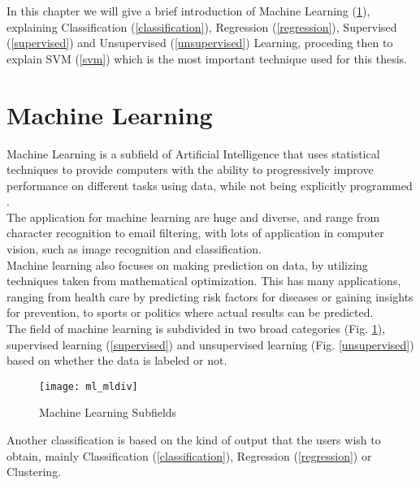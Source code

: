 In this chapter we will give a brief introduction of Machine Learning (\ref{ml}), explaining Classification (\ref{classification}), Regression (\ref{regression}), Supervised (\ref{supervised}) and Unsupervised (\ref{unsupervised}) Learning, proceding then to explain SVM (\ref{svm}) which is the most important technique used for this thesis.

\section{Machine Learning} \label{ml}
Machine Learning is a subfield of Artificial Intelligence that uses statistical techniques to provide computers with the ability to progressively improve performance on different tasks using data, while not being explicitly programmed \cite{wiki:ml}. \\
The application for machine learning are huge and diverse, and range from character recognition to email filtering, with lots of application in computer vision, such as image recognition and classification. \\
Machine learning also focuses on making prediction on data, by utilizing techniques taken from mathematical optimization. This has many applications, ranging from health care by predicting risk factors for diseases or gaining insights for prevention, to sports or politics where actual results can be predicted.\\
The field of machine learning is subdivided in two broad categories (Fig. \ref{fig:ml_mldiv}), supervised learning (\ref{supervised}) and unsupervised learning (Fig. \ref{unsupervised}) based on whether the data is labeled or not.\\

\begin{figure}[H]
	\centering
	\texttt{[image: ml\_mldiv]}
	\caption{Machine Learning Subfields \cite{ml_mldiv}}
	\label{fig:ml_mldiv}
\end{figure}

Another classification is based on the kind of output that the users wish to obtain, mainly Classification (\ref{classification}), Regression (\ref{regression}) or Clustering.

